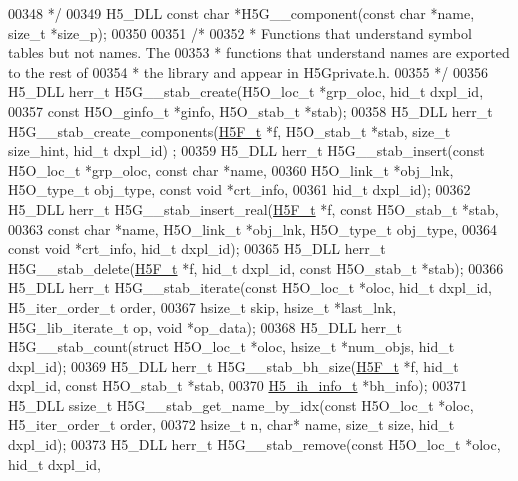 \begin{DoxyCode}
00348 \textcolor{comment}{ */}
00349 H5\_DLL \textcolor{keyword}{const} \textcolor{keywordtype}{char} *H5G\_\_component(\textcolor{keyword}{const} \textcolor{keywordtype}{char} *name, \textcolor{keywordtype}{size\_t} *size\_p);
00350 
00351 \textcolor{comment}{/*}
00352 \textcolor{comment}{ * Functions that understand symbol tables but not names.  The}
00353 \textcolor{comment}{ * functions that understand names are exported to the rest of}
00354 \textcolor{comment}{ * the library and appear in H5Gprivate.h.}
00355 \textcolor{comment}{ */}
00356 H5\_DLL herr\_t H5G\_\_stab\_create(H5O\_loc\_t *grp\_oloc, hid\_t dxpl\_id,
00357     \textcolor{keyword}{const} H5O\_ginfo\_t *ginfo, H5O\_stab\_t *stab);
00358 H5\_DLL herr\_t H5G\_\_stab\_create\_components(\hyperlink{struct_h5_f__t}{H5F\_t} *f, H5O\_stab\_t *stab, \textcolor{keywordtype}{size\_t} size\_hint, hid\_t dxpl\_id)
      ;
00359 H5\_DLL herr\_t H5G\_\_stab\_insert(\textcolor{keyword}{const} H5O\_loc\_t *grp\_oloc, \textcolor{keyword}{const} \textcolor{keywordtype}{char} *name,
00360     H5O\_link\_t *obj\_lnk, H5O\_type\_t obj\_type, \textcolor{keyword}{const} \textcolor{keywordtype}{void} *crt\_info,
00361     hid\_t dxpl\_id);
00362 H5\_DLL herr\_t H5G\_\_stab\_insert\_real(\hyperlink{struct_h5_f__t}{H5F\_t} *f, \textcolor{keyword}{const} H5O\_stab\_t *stab,
00363     \textcolor{keyword}{const} \textcolor{keywordtype}{char} *name, H5O\_link\_t *obj\_lnk, H5O\_type\_t obj\_type,
00364     \textcolor{keyword}{const} \textcolor{keywordtype}{void} *crt\_info, hid\_t dxpl\_id);
00365 H5\_DLL herr\_t H5G\_\_stab\_delete(\hyperlink{struct_h5_f__t}{H5F\_t} *f, hid\_t dxpl\_id, \textcolor{keyword}{const} H5O\_stab\_t *stab);
00366 H5\_DLL herr\_t H5G\_\_stab\_iterate(\textcolor{keyword}{const} H5O\_loc\_t *oloc, hid\_t dxpl\_id, H5\_iter\_order\_t order,
00367     hsize\_t skip, hsize\_t *last\_lnk, H5G\_lib\_iterate\_t op, \textcolor{keywordtype}{void} *op\_data);
00368 H5\_DLL herr\_t H5G\_\_stab\_count(\textcolor{keyword}{struct} H5O\_loc\_t *oloc, hsize\_t *num\_objs, hid\_t dxpl\_id);
00369 H5\_DLL herr\_t H5G\_\_stab\_bh\_size(\hyperlink{struct_h5_f__t}{H5F\_t} *f, hid\_t dxpl\_id, \textcolor{keyword}{const} H5O\_stab\_t *stab,
00370     \hyperlink{struct_h5__ih__info__t}{H5\_ih\_info\_t} *bh\_info);
00371 H5\_DLL ssize\_t H5G\_\_stab\_get\_name\_by\_idx(\textcolor{keyword}{const} H5O\_loc\_t *oloc, H5\_iter\_order\_t order,
00372     hsize\_t n, \textcolor{keywordtype}{char}* name, \textcolor{keywordtype}{size\_t} size, hid\_t dxpl\_id);
00373 H5\_DLL herr\_t H5G\_\_stab\_remove(\textcolor{keyword}{const} H5O\_loc\_t *oloc, hid\_t dxpl\_id,

\end{DoxyCode}
